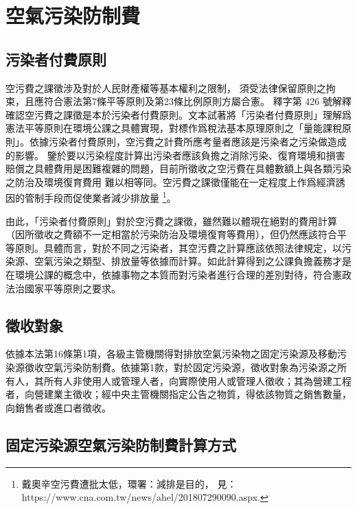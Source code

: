 \section{空氣污染防制費}

\subsection{污染者付費原則}
空污費之課徵涉及對於人民財產權等基本權利之限制，
須受法律保留原則之拘束，且應符合憲法第7條平等原則及第23條比例原則方屬合憲。
釋字第 426 號解釋確認空污費之課徵是本於污染者付費原則。文本試著將「污染者付費原則」理解爲憲法平等原則在環境公課之具體實現，對標作爲稅法基本原理原則之「量能課稅原則」。依據污染者付費原則，空污費之計費所應考量者應該是污染者之污染做造成的影響。
鑒於要以污染程度計算出污染者應該負擔之消除污染、復育環境和損害賠償之具體費用是困難複雜的問題，目前所徵收之空污費在具體數額上與各類污染之防治及環境復育費用
難以相等同。空污費之課徵僅能在一定程度上作爲經濟誘因的管制手段而促使業者減少排放量
\footnote{戴奧辛空污費遭批太低，環署：減排是目的，
見：https://www.cna.com.tw/news/ahel/201807290090.aspx.}。

由此，「污染者付費原則」對於空污費之課徵，雖然難以體現在絕對的費用計算（因所徵收之費額不一定相當於污染防治及環境復育等費用），但仍然應該符合平等原則。具體而言，對於不同之污染者，其空污費之計算應該依照法律規定，以污染源、空氣污染之類型、排放量等依據而計算。如此計算得到之公課負擔義務才是在環境公課的概念中，依據事物之本質而對污染者進行合理的差別對待，符合憲政法治國家平等原則之要求。


\subsection{徵收對象}

依據本法第16條第1項，各級主管機關得對排放空氣污染物之固定污染源及移動污染源徵收空氣污染防制費。依據第1款，對於固定污染源，徵收對象為污染源之所有人，其所有人非使用人或管理人者，向實際使用人或管理人徵收；其為營建工程者，向營建業主徵收；經中央主管機關指定公告之物質，得依該物質之銷售數量，向銷售者或進口者徵收。

\subsection{固定污染源空氣污染防制費計算方式}

